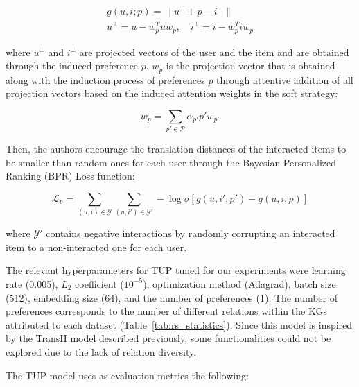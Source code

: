 \begin{gather}
g(u, i; p) = \| u^{\perp} + p - i^{\perp} \| \\
u^{\perp} = u - w_p^T u w_p, \quad
i^{\perp} = i - w_p^T i w_p   
\label{equation:hyperplane}
\end{gather}
 
where $u^{\perp}$ and $i^{\perp}$ are projected vectors of the user and the item and are obtained through the induced preference $p$. $w_p$ is the projection vector that is obtained along with the induction process of preferences $p$ through attentive addition of all projection vectors based on the induced attention weights in the soft strategy:

\begin{equation}
w_p = \sum_{p' \in \mathcal{P}} \alpha_{p'} p' w_{p'}
\label{equation:wp}
\end{equation}

Then, the authors encourage the translation distances of the interacted items to be smaller than random ones for each user through the  Bayesian Personalized Ranking (BPR) Loss function:

\begin{equation}
\mathcal{L}_p = \sum_{(u, i) \in \mathcal{Y}} \sum_{(u, i') \in \mathcal{Y}'} - \log \sigma [g(u, i'; p') - g(u, i; p)]
\label{equation:ir}
\end{equation}

where $\mathcal{Y}'$ contains negative interactions by randomly corrupting an interacted item to a non-interacted one for each user. 

The relevant hyperparameters for TUP tuned for our experiments were learning rate (0.005), $L_2$ coefficient ($10^{-5}$), optimization method (Adagrad), batch size (512), embedding size (64), and the number of preferences (1). The number of preferences corresponds to the number of different relations within the KGs attributed to each dataset (Table~\ref{tab:rs_statistics}). Since this model is inspired by the TransH model described previously, some functionalities could not be explored due to the lack of relation diversity. 

The TUP model uses as evaluation metrics the following:

